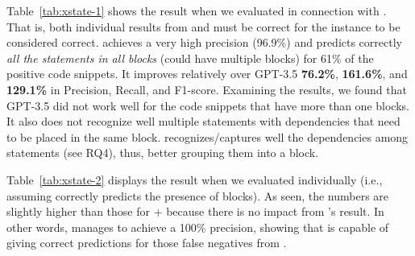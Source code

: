 Table~\ref{tab:xstate-1} shows the result when we evaluated {\xstate}
in connection with {\xblock}. That is, both individual results from
{\xblock} and {\xstate} must be correct for the instance to be
considered correct. {\tool} achieves a very high precision (96.9\%)
and predicts correctly {\em all the statements in all 
  blocks} (could have multiple blocks) for 61\% of the positive code
snippets. It improves relatively over GPT-3.5 {\bf
  76.2\%}, {\bf 161.6\%}, and {\bf 129.1\%} in Precision, Recall, and
F1-score. Examining the results, we found that GPT-3.5 did not work
well for the code snippets that have more than one 
blocks. It also does not recognize well multiple statements with
dependencies that need to be placed in the same block. {\tool}
recognizes/captures well the dependencies among statements (see RQ4),
thus, better grouping them into a  block.


Table~\ref{tab:xstate-2} displays the result when we evaluated
{\xstate} individually (i.e., assuming {\xblock} correctly predicts
the presence of  blocks). As seen, the numbers are
slightly higher than those for {\xblock}+{\xstate} because there is no
impact from {\xblock}'s result. In other words, {\xstate} manages to
achieve a 100\% precision, showing that {\xstate} is capable of giving
correct predictions for those false negatives from {\xblock}.


%

